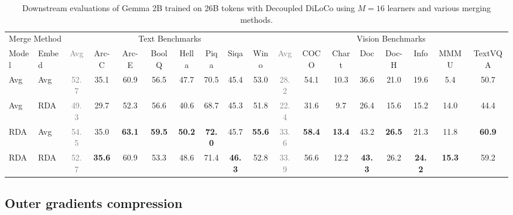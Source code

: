 \documentclass[11pt, a4paper, twocolumn, copyright, google]{google}
\begin{document}
\begin{table}[t]
    \centering
    \footnotesize
    \setlength{\tabcolsep}{2.5pt}
    \begin{tabular}{ll cccccccc cccccccc}
        \toprule
        \multicolumn{2}{c}{Merge Method} & \multicolumn{8}{c}{Text Benchmarks} & \multicolumn{8}{c}{Vision Benchmarks} \\
        \cmidrule(lr){1-2} \cmidrule(lr){3-10} \cmidrule(lr){11-18}
        Model & Embed & \textcolor{gray}{\scriptsize Avg} & Arc-C & Arc-E & BoolQ & Hella & Piqa & Siqa & Wino & \textcolor{gray}{\scriptsize Avg} & COCO & Chart & Doc & Doc-H & Info & MMMU & TextVQA \\
        \midrule
        Avg           & Avg           & \textcolor{gray}{\scriptsize 52.7} & 35.1          & 60.9          & 56.5          & 47.7          & 70.5          & 45.4          & 53.0          & \textcolor{gray}{\scriptsize 28.2} & 54.1          & 10.3          & 36.6          & 21.0          & 19.6          & 5.4           & 50.7          \\
        Avg           & RDA           & \textcolor{gray}{\scriptsize 49.3} & 29.7          & 52.3          & 56.6          & 40.6          & 68.7          & 45.3          & 51.8          & \textcolor{gray}{\scriptsize 22.4} & 31.6          & 9.7           & 26.4          & 15.6          & 15.2          & 14.0          & 44.4          \\
        RDA           & Avg           & \textcolor{gray}{\scriptsize 54.5} & 35.0          & \textbf{63.1} & \textbf{59.5} & \textbf{50.2} & \textbf{72.0} & 45.7          & \textbf{55.6} & \textcolor{gray}{\scriptsize 33.6} & \textbf{58.4} & \textbf{13.4} & 43.2          & \textbf{26.5} & 21.3          & 11.8          & \textbf{60.9} \\
        RDA           & RDA           & \textcolor{gray}{\scriptsize 52.7} & \textbf{35.6} & 60.9          & 53.3          & 48.6          & 71.4          & \textbf{46.3} & 52.8          & \textcolor{gray}{\scriptsize 33.9} & 56.6          & 12.2          & \textbf{43.3} & 26.2          & \textbf{24.2} & \textbf{15.3} & 59.2          \\
        \bottomrule
    \end{tabular}
    \caption{Downstream evaluations of Gemma 2B trained on 26B tokens with Decoupled DiLoCo using $M = 16$ learners and various merging methods.}
    \label{tab:merging_ablation_m_16}
\end{table}


\subsection{Outer gradients compression}
\end{document}
